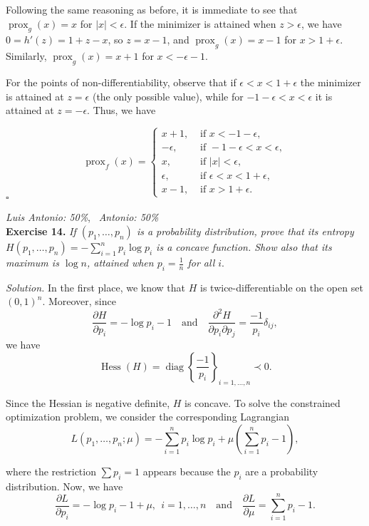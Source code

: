 \documentclass[12pt]{article}
\newcommand*{\QED}{\null\nobreak\hfill\ensuremath{\square}}%
\begin{document}
\begin{itemize}
Following the same reasoning as before, it is immediate to see that $\operatorname{prox}_g(x)=x$ for $|x|<\epsilon$. If the minimizer is attained when $z>\epsilon$, we have $0=h'(z)=1+z-x$, so $z=x-1$, and $\operatorname{prox}_g(x)=x-1$ for $x>1+\epsilon$. Similarly, $\operatorname{prox}_g(x)=x+1$ for $x< -\epsilon-1$.

For the points of non-differentiability, observe that if $\epsilon<x<1+\epsilon$ the minimizer is attained at $z=\epsilon$ (the only possible value), while for $-1-\epsilon<x<\epsilon$ it is attained at $z=-\epsilon$. Thus, we have

        \[
             \operatorname{prox}_f(x)= \begin{cases}
               x+1, & \text{ if } x< - 1 - \epsilon,\\
               -\epsilon,  & \text{ if } -1-\epsilon<x<\epsilon,\\
               x, & \text{ if } |x| < \epsilon,\\
               \epsilon,  & \text{ if } \epsilon < x < 1+\epsilon,\\
               x-1, & \text{ if } x>1+\epsilon.
           \end{cases}
        \]
        \QED
\end{itemize}

\vspace{0.5em}
\textit{Luis Antonio: 50\%}, \ \textit{Antonio: 50\%}\\
\textbf{Exercise 14. }\emph{If \( (p_1,\dots,p_n) \) is a probability distribution, prove that its entropy \( H(p_1, \dots, p_n) = - \sum_{i=1}^n p_i \log p_i\) is a concave function. Show also that its maximum is \( \log n \), attained when \( p_i = \frac{1}{n}\) for all $i$}.

\emph{Solution. } In the first place, we know that $H$ is twice-differentiable on the open set $(0,1)^n$. Moreover, since
\[
\frac{\partial H}{\partial p_i} = -\log p_i - 1 \quad \text{and} \quad \frac{\partial^2 H}{\partial p_i\partial p_j} = \frac{-1}{p_i}\delta_{ij},
\]
we have
\[
\operatorname{Hess}(H) = \operatorname{diag}\left\{\frac{-1}{p_i}\right\}_{i=1,\dots,n} \prec 0.
\]

Since the Hessian is negative definite, $H$ is concave. To solve the constrained optimization problem, we consider the corresponding Lagrangian
\[ L(p_1,\dots, p_n; \mu) = - \sum_{i=1}^n p_i \log p_i + \mu\left(\sum_{i=1}^n p_i - 1\right),\]

where the restriction $\sum p_i=1$ appears because the $p_i$ are a probability distribution. Now, we have
\[
     \frac{\partial L}{\partial p_i} = -\log p_i - 1 + \mu, \ \  i=1,\dots,n \quad \text{and} \quad \frac{\partial L}{\partial \mu} =\sum_{i=1}^n p_i - 1.
\]
\end{document}
